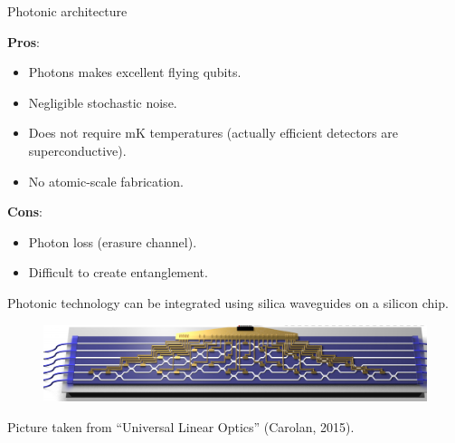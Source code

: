 \documentclass{beamer}
\begin{document}
\begin{frame}{Photonic architecture}
\begin{center}

\textbf{Pros}:

\begin{itemize}
\item Photons makes excellent flying qubits.
\item Negligible stochastic noise.
\item Does not require mK temperatures (actually efficient detectors are superconductive).
\item No atomic-scale fabrication.
\end{itemize}

\textbf{Cons}:

\begin{itemize}
\item Photon loss (erasure channel).
\item Difficult to create entanglement.
\end{itemize}

\end{center}
\end{frame}


\begin{frame}
\begin{center}



Photonic technology can be integrated using silica waveguides on a silicon chip.

\begin{figure}[!htb]
\centering
\includegraphics[scale=.20]{immagini/integrated.png}
\end{figure}

Picture taken from ``Universal Linear Optics'' (Carolan, 2015).

\end{center}
\end{frame}
\end{document}
